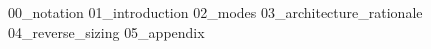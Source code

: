 {00_notation}
\pagebreak
{}
{01_introduction}
{02_modes}
{03_architecture_rationale}
{04_reverse_sizing}
\pagebreak
{05_appendix}